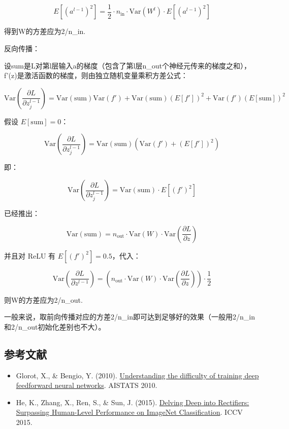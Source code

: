 \[
E[(a^{l-1})^2]
=\frac{1}{2}\cdot n_{\mathrm{in}}\cdot \mathrm{Var}(W^l)\cdot E[(a^{l-1})^2]
\]

得到W的方差应为2/n\_in.

反向传播：

设sum是L对第l层输入a的梯度（包含了第l层n\_out个神经元传来的梯度之和），f'(z)是激活函数的梯度，则由独立随机变量乘积方差公式：

\[
\mathrm{Var}\left(\frac{\partial L}{\partial z_j^{l-1}}\right)
=\mathrm{Var}(\mathrm{sum})\mathrm{Var}(f')
+\mathrm{Var}(\mathrm{sum})(E[f'])^2
+\mathrm{Var}(f')(E[\mathrm{sum}])^2
\]

假设 \(E[\mathrm{sum}]=0\)：

\[
\mathrm{Var}\left(\frac{\partial L}{\partial z_j^{l-1}}\right)
=\mathrm{Var}(\mathrm{sum})\left(\mathrm{Var}(f')+(E[f'])^2\right)
\]

即：

\[
\mathrm{Var}\left(\frac{\partial L}{\partial z_j^{l-1}}\right)
=\mathrm{Var}(\mathrm{sum})\cdot E[(f')^2]
\]

已经推出：

\[
\mathrm{Var}(\mathrm{sum})
=n_{\mathrm{out}}\cdot\mathrm{Var}(W)\cdot
\mathrm{Var}\left(\frac{\partial L}{\partial z}\right)
\]

并且对 ReLU 有 \(E[(f')^2]=0.5\)，代入：

\[
\mathrm{Var}\left(\frac{\partial L}{\partial z^{l-1}}\right)
=\left(n_{\mathrm{out}}\cdot\mathrm{Var}(W)\cdot
\mathrm{Var}\left(\frac{\partial L}{\partial z}\right)\right)\cdot\frac{1}{2}
\]

则W的方差应为2/n\_out.

一般来说，取前向传播对应的方差2/n\_in即可达到足够好的效果（一般用2/n\_in和2/n\_out初始化差别也不大）。

\hypertarget{ux53c2ux8003ux6587ux732e-7}{%
\subsection{参考文献}\label{ux53c2ux8003ux6587ux732e-7}}

\begin{itemize}
\tightlist
\item
  Glorot, X., \& Bengio, Y. (2010). \href{https://proceedings.mlr.press/v9/glorot10a.html}{Understanding the difficulty of training deep feedforward neural networks}. AISTATS 2010.
\item
  He, K., Zhang, X., Ren, S., \& Sun, J. (2015). \href{https://arxiv.org/abs/1502.01852}{Delving Deep into Rectifiers: Surpassing Human-Level Performance on ImageNet Classification}. ICCV 2015.
\end{itemize}

